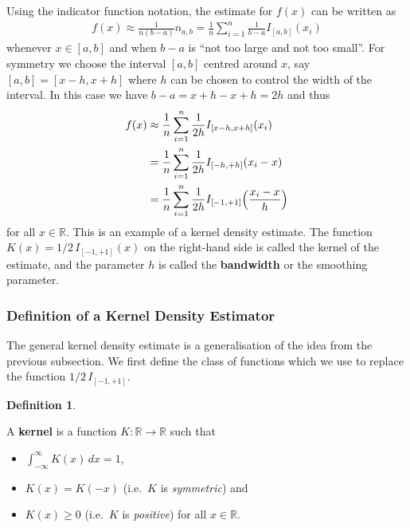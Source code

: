 \documentclass[
  a4paper,
]{article}
\providecommand{\tightlist}{%
  \setlength{\itemsep}{0pt}\setlength{\parskip}{0pt}}
\theoremstyle{definition}
\newtheorem{definition}{Definition}[section]
\theoremstyle{definition}
\theoremstyle{definition}
\theoremstyle{definition}
\theoremstyle{remark}
\begin{document}
Using the indicator function notation, the estimate for \(f(x)\)
can be written as
\begin{align*}
  f(x)
  \approx \frac{1}{n(b-a)} n_{a,b}
  = \frac{1}{n} \sum_{i=1}^n \frac{1}{b-a} I_{[a,b]}(x_i)
\end{align*}
whenever \(x \in [a,b]\) and when \(b-a\) is ``not too large and not too small''.
For symmetry we choose the interval \([a, b]\) centred around \(x\),
say \([a, b] = [x - h, x + h]\) where \(h\) can be chosen to control the
width of the interval. In this case we have \(b - a = x + h - x + h = 2h\) and thus
\begin{align*}
  f(x)
  &\approx \frac{1}{n} \sum_{i=1}^n \frac{1}{2h} I_{[x-h,x+h]}(x_i) \\
  &= \frac{1}{n} \sum_{i=1}^n \frac{1}{2h} I_{[-h,+h]}(x_i-x) \\
  &= \frac{1}{n} \sum_{i=1}^n \frac{1}{2h} I_{[-1,+1]}\Bigl(\frac{x_i-x}{h}\Bigr)
\end{align*}
for all \(x \in \mathbb{R}\). This is an example of a kernel density estimate.
The function \(K(x) = 1/2 \, I_{[-1,+1]}(x)\) on the right-hand side is
called the kernel of the estimate, and the parameter \(h\) is called the
\textbf{bandwidth} or the smoothing parameter.

\hypertarget{definition-of-a-kernel-density-estimator}{%
\subsubsection{Definition of a Kernel Density Estimator}\label{definition-of-a-kernel-density-estimator}}

The general kernel density estimate is a generalisation of the idea
from the previous subsection. We first define the class of functions
which we use to replace the function \(1/2 \, I_{[-1,+1]}\).

\begin{definition}
\protect\hypertarget{def:kernel}{}\label{def:kernel}

A \textbf{kernel} is a function \(K\colon \mathbb{R}\to \mathbb{R}\) such that

\begin{itemize}
\tightlist
\item
  \(\int_{-\infty}^\infty K(x) \,dx = 1\),
\item
  \(K(x) = K(-x)\) (i.e.~\(K\) is \emph{symmetric}) and
\item
  \(K(x) \geq 0\) (i.e.~\(K\) is \emph{positive}) for all \(x\in \mathbb{R}\).
\end{itemize}

\end{definition}
\end{document}
